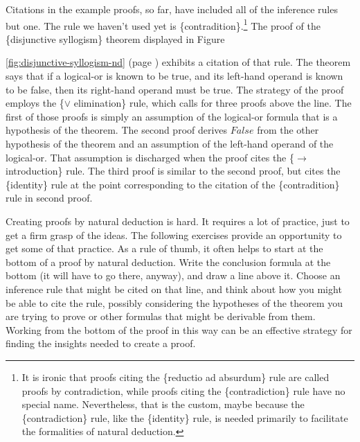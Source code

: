 {Citations in the example proofs, so far, have included all of the inference rules
but one. The rule we haven't used yet is \{contradition\}.\footnote{It
is ironic that proofs citing the \{reductio ad absurdum\} rule
are called proofs by contradiction, while proofs citing the
\{contradiction\} rule have no special name.
Nevertheless, that is the custom, maybe because
the \{contradiction\} rule, like the \{identity\} rule,
is needed primarily to facilitate the formalities of
natural deduction.}
The proof of the \{disjunctive syllogism\} theorem displayed in
Figure~{\ref{fig:disjunctive-syllogism-nd} (page \pageref{fig:disjunctive-syllogism-nd})
exhibits a citation of that rule.
The theorem says that if a logical-or is known to be true,
and its left-hand operand is known to be false,
then its right-hand operand must be true.
The strategy of the proof employs the \{$\vee$ elimination\} rule,
which calls for three proofs above the line.
The first of those proofs is simply an assumption of
the logical-or formula that is a hypothesis of the theorem.
The second proof derives $False$ from the other hypothesis
of the theorem and an assumption of the left-hand operand
of the logical-or. That assumption is discharged when
the proof cites the \{$\rightarrow$ introduction\} rule.
The third proof is similar to the second proof,
but cites the \{identity\} rule at the point
corresponding to the citation of the \{contradition\} rule in second proof.

Creating proofs by
natural deduction is hard.
It requires a lot of practice, just to get
a firm grasp of the ideas.
The following exercises provide an opportunity
to get some of that practice. As a
rule of thumb,
it often helps to start at the bottom
of a proof by natural deduction. Write the conclusion formula
at the bottom (it will have to go there, anyway),
and draw a line above it. Choose an inference rule that
might be cited on that line, and think about how you might
be able to cite the rule, possibly considering the hypotheses of
the theorem you are trying to prove or other formulas
that might be derivable from them. Working from the bottom
of the proof in this way can be an effective strategy for
finding the insights needed to create a proof.

}}
